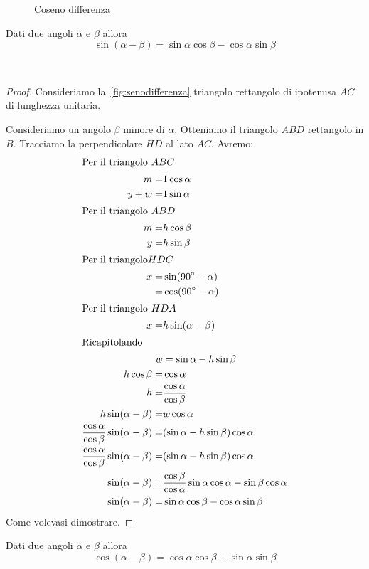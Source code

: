 \begin{figure}
	\centering
	
	\caption[Coseno differenza]{Coseno differenza}
	\label{fig:cosenodifferenza}
\end{figure}
\begin{thm}\label{thm:Senodifferenza}
	Dati due angoli $\alpha$ e $\beta$ allora
	\[\sin(\alpha-\beta)=\sin\alpha\cos\beta-\cos\alpha\sin\beta  \]
\end{thm}~\cite{Smiley1999}
\begin{proof}
	Consideriamo la~\vref{fig:senodifferenza} triangolo rettangolo di ipotenusa $AC$ di lunghezza unitaria. 
	
	Consideriamo un angolo $\beta$ minore di $\alpha$. Otteniamo il triangolo $ABD$ rettangolo in $B$. Tracciamo la perpendicolare $HD$ al lato $AC$. Avremo:
	\begin{align*}
	\intertext{Per il triangolo $ABC$}
	m=&1\cos\alpha\\
	y+w=&1\sin\alpha\\
	\intertext{Per il triangolo $ABD$}
	m=&h\cos\beta\\
	y=&h\sin\beta\\
	\intertext{Per il triangolo$HDC$}
	x=&\sin(90^{\circ}-\alpha)\\
	=&\cos(90^{\circ}-\alpha)\\
	\intertext{Per il triangolo $HDA$}
	x=&h\sin(\alpha-\beta)\\ 
	\intertext{Ricapitolando}
	w&=\sin\alpha-h\sin\beta\\
	h\cos\beta=&\cos\alpha\\
	h=&\dfrac{\cos\alpha}{\cos\beta}\\
	h\sin(\alpha-\beta)=&w\cos\alpha\\
	\dfrac{\cos\alpha}{\cos\beta}\sin(\alpha-\beta)=&(\sin\alpha-h\sin\beta)\cos\alpha\\
	\dfrac{\cos\alpha}{\cos\beta}\sin(\alpha-\beta)=&(\sin\alpha-h\sin\beta)\cos\alpha\\
	\sin(\alpha-\beta)=&\dfrac{\cos\beta}{\cos\alpha}\sin\alpha\cos\alpha-\sin\beta\cos\alpha\\
	\sin(\alpha-\beta)=&\sin\alpha\cos\beta-\cos\alpha\sin\beta\\
	\end{align*} 
	Come volevasi dimostrare.
\end{proof}
\begin{thm}\label{thm:cosenodifferenza}
	Dati due angoli $\alpha$ e $\beta$ allora
	\[\cos(\alpha-\beta)=\cos\alpha\cos\beta+\sin\alpha\sin\beta  \]	
\end{thm}~\cite{Smiley1999}
